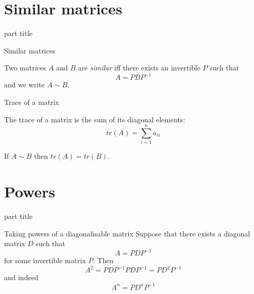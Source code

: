\documentclass{beamer}
\begin{document}
\section{Similar matrices}

\begin{frame}
\begin{beamercolorbox}[sep=12pt,center]{part title}
\insertsection\par
\end{beamercolorbox}
\end{frame}

\begin{frame}{Similar matrices}
\begin{definition}
	Two matrices $A$ and $B$ are \emph{similar} iff there exists an invertible $P$ such that
	\begin{equation*}
	A = PBP^{-1}
	\end{equation*}
	and we write $A\sim B$.
\end{definition}
\end{frame}

\begin{frame}{Trace of a matrix}
\begin{definition}
	The trace of a matrix is the sum of its diagonal elements:
	\begin{equation*}
	tr(A) = \sum_{i=1}^n a_{ii}
	\end{equation*}
\end{definition}
\begin{theorem}
	If $A\sim B$ then $tr(A) = tr(B)$.
\end{theorem}
\end{frame}

\section{Powers}

\begin{frame}
\begin{beamercolorbox}[sep=12pt,center]{part title}
\insertsection\par
\end{beamercolorbox}
\end{frame}


\begin{frame}{Taking powers of a diagonalisable matrix}
Suppose that there exists a diagonal matrix $D$ such that
\begin{equation*}
A = P D P^{-1}
\end{equation*}
for some invertible matrix $P$.
Then
\begin{equation*}
A^2 = PDP^{-1}PDP^{-1} = PD^2P^{-1}
\end{equation*}
and indeed
\begin{equation*}
A^n = PD^nP^{-1}
\end{equation*}
\end{frame}
\end{document}
